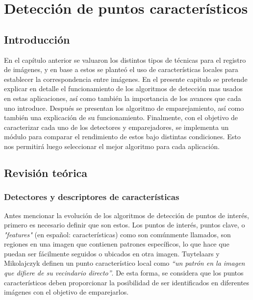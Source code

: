 \chapter{Detección de puntos característicos}
\label{capitulo3}


\section{Introducción}

En el capítulo anterior se valuaron los distintos tipos de técnicas para el registro de imágenes, y en base a estos se planteó el uso de características locales para establecer la correspondencia entre imágenes. En el presente capitulo se pretende explicar en detalle el funcionamiento de los algoritmos de detección mas usados en estas aplicaciones, así como también la importancia de los avances que cada uno introduce. Después se presentan los algoritmo de emparejamiento, así como también una explicación de su funcionamiento. Finalmente, con el objetivo de caracterizar cada uno de los detectores y emparejadores, se implementa un módulo para comparar el rendimiento de estos bajo distintas condiciones. Esto nos permitirá luego seleccionar el mejor algoritmo para cada aplicación.

\section{Revisión teórica}

\subsection{Detectores y descriptores de características}

Antes mencionar la evolución de los algoritmos de detección de puntos de interés, primero es necesario definir que son estos. Los puntos de interés, puntos clave, o \textit{"features"} (en español: características) como son comúnmente llamados, son regiones en una imagen que contienen patrones específicos, lo que hace que puedan ser fácilmente seguidos o ubicados en otra imagen. Tuytelaars y Mikolajczyk \cite{Tuytelaars} definen un punto característico local como \textit{``un patrón en la imagen que difiere de su vecindario directo''}. De esta forma, se considera que los puntos característicos deben proporcionar la posibilidad de ser identificados en diferentes imágenes con el objetivo de emparejarlos.


